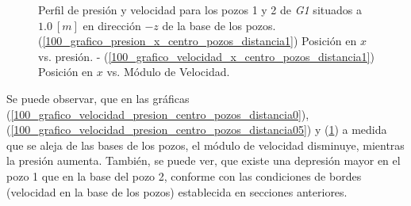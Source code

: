 \documentclass[10pt,a4paper,final]{article}
\begin{document}
\begin{figure}[tbhp]
   \centering
   \hspace{0.1\linewidth}
    \caption{Perfil de presión y velocidad para los pozos 1 y 2 de \emph{G1} situados a $1.0~[m]$ en dirección $-z$ de la base de los pozos. (\ref{100_grafico_presion_x_centro_pozos_distancia1}) Posición en $x$ vs. presión. - (\ref{100_grafico_velocidad_x_centro_pozos_distancia1}) Posición en $x$ vs. Módulo de Velocidad.}
   \label{100_grafico_velocidad_presion_centro_pozos_distancia1}                %
\end{figure}

Se puede observar, que en las gráficas (\ref{100_grafico_velocidad_presion_centro_pozos_distancia0}), (\ref{100_grafico_velocidad_presion_centro_pozos_distancia05}) y (\ref{100_grafico_velocidad_presion_centro_pozos_distancia1}) a medida que se aleja de las bases de los pozos, el módulo de velocidad disminuye, mientras la presión aumenta. También, se puede ver, que existe una depresión mayor en el pozo 1 que en la base del pozo 2, conforme con las condiciones de bordes (velocidad en la base de los pozos) establecida en secciones anteriores.
\end{document}
